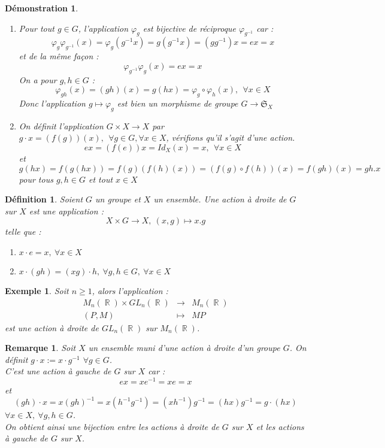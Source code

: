 \documentclass[a4paper, oneside]{report}
\theoremstyle{break}
\newtheorem{defi}[thm]{Définition}
\newtheorem{exem}[thm]{Exemple}
\newtheorem{remar}[thm]{Remarque}
\newtheorem*{demo}{Démonstration}
\newcommand{\x}{\times}
\DeclareMathOperator{\R}{\mathbb{R}}
\renewcommand{\S}{\mathfrak{S}}
\begin{document}
\begin{demo}
	\begin{enumerate}
		\item Pour tout $g\in G$, l'application $\varphi_g$ est bijective de réciproque $\varphi_{g^{-1}}$ car :
		$$\varphi_g\varphi_{g^{-1}}(x)=\varphi_g(g^{-1}x)=g(g^{-1}x)=(gg^{-1})x=ex=x$$
		et de la même façon :
		$$\varphi_{g^{-1}}\varphi_g(x)=ex=x$$
		On a pour $g,h\in G$ :
		$$\varphi_{gh}(x)=(gh)(x)=g(hx)=\varphi_g\circ \varphi_h(x),~~\forall x\in X$$
		Donc l'application $g\mapsto \varphi_g$ est bien un morphisme de groupe $G\rightarrow \S_X$
		\item On définit l'application $G\x X \rightarrow X$ par $g \cdot x = (f(g))(x),~~\forall g\in G,\forall x\in X$, vérifions qu'il s'agit d'une action.\\
		$$ex=(f(e))x=Id_X(x)=x,~~\forall x\in X$$
		et 
		$$g(hx)=f(g(hx))=f(g)(f(h)(x))=(f(g)\circ f(h) )(x)=f(gh)(x)=gh.x$$
		pour tous $g,h\in G$ et tout $x\in X$
	\end{enumerate}
\end{demo}


\begin{defi}
	Soient $G$ un groupe et $X$ un ensemble. Une action à droite de $G$ sur $X$ est une application :
	$$X\x G\rightarrow X,~(x,g)\mapsto x.g$$
	telle que :
	\begin{enumerate}
		\item $x \cdot e=x,~\forall x\in X$
		\item $x \cdot (gh)=(xg) \cdot h,~\forall g,h\in G,~\forall x\in X$
	\end{enumerate}
\end{defi}

\begin{exem}
	Soit $n\geq 1$, alors l'application :
	$$\begin{array}{lll}
	M_n(\R)\x GL_n(\R)&\rightarrow & M_n(\R)\\
	(P,M)&\mapsto & MP
	\end{array}$$
	est une action à droite de $GL_n(\R)$ sur $M_n(\R)$.
\end{exem}

\begin{remar}
	Soit $X$ un ensemble muni d'une action à droite d'un groupe $G$. On définit $g \cdot x := x \cdot g^{-1}$ $\forall g\in G$.\\
	C'est une action à gauche de $G$ sur $X$ car :
	$$ex=xe^{-1}=xe=x$$
	et 
	$$(gh) \cdot x=x(gh)^{-1}=x(h^{-1}g^{-1})=(xh^{-1})g^{-1}=(hx)g^{-1}=g \cdot (hx)$$
	$\forall x\in X, ~\forall g,h\in G$.\\
	On obtient ainsi une bijection entre les actions à droite de $G$ sur $X$ et les actions à gauche de $G$ sur $X$.
\end{remar}
\end{document}
